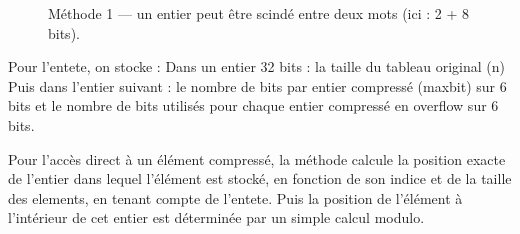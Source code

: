 \documentclass{rapportClass} %
\begin{document}
\begin{figure}[h!]

    \caption{Méthode 1 — un entier peut être scindé entre deux mots (ici : 2 + 8 bits).}
\end{figure}

Pour l'entete, on stocke :
Dans un entier 32 bits : la taille du tableau original (n)
Puis dans l'entier suivant : le nombre de bits par entier compressé (maxbit) sur 6 bits et le nombre de bits utilisés pour chaque entier compressé en overflow sur 6 bits.

Pour l'accès direct à un élément compressé, la méthode calcule la position exacte de l'entier dans lequel l'élément est stocké, en fonction de son indice et de la taille des elements, en tenant compte de l'entete.
Puis la position de l'élément à l'intérieur de cet entier est déterminée par un simple calcul modulo.

\end{document}
